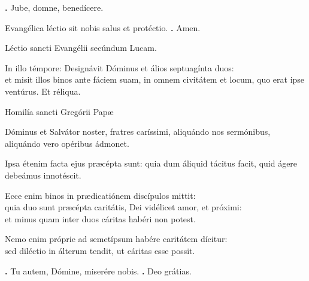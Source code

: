 \begin{small}
\textbf{\Vbar.} Jube, domne, benedícere.

Evangélica léctio sit nobis salus et protéctio.
\textbf{\Rbar.} Amen.
\end{small}


Léctio sancti Evangélii secúndum Lucam.

In illo témpore: Designávit Dóminus et álios septuagínta duos: \\
et misit illos binos ante fáciem suam, in omnem civitátem et locum, quo erat ipse ventúrus. Et réliqua.

Homilía sancti Gregórii Papæ

Dóminus et Salvátor noster, fratres caríssimi, aliquándo nos sermónibus, aliquándo vero opéribus ádmonet. 

Ipsa étenim facta ejus præcépta sunt: quia dum áliquid tácitus facit, quid ágere debeámus innotéscit. 

Ecce enim binos in prædicatiónem discípulos mittit: \\
quia duo sunt præcépta caritátis, Dei vidélicet amor, et próximi: \\
et minus quam inter duos cáritas habéri non potest. 

Nemo enim próprie ad semetípsum habére caritátem dícitur: \\
sed diléctio in álterum tendit, ut cáritas esse possit.

\textbf{\Vbar.} Tu autem, Dómine, miserére nobis.
\textbf{\Rbar.} Deo grátias.

